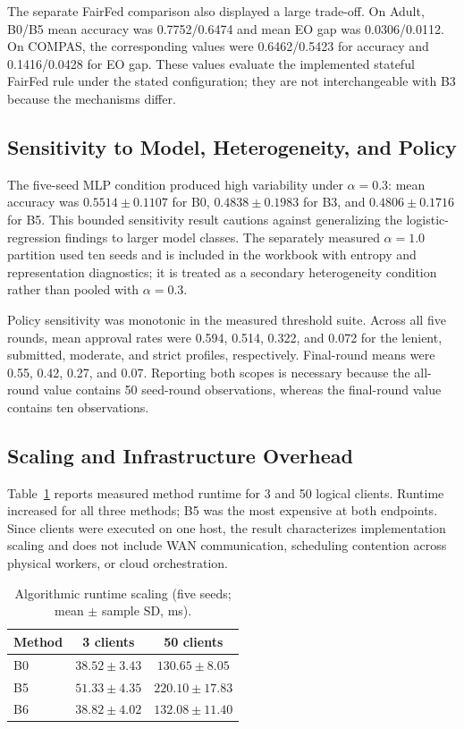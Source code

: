 \documentclass[futureinternet,article,submit,pdftex,moreauthors]{Definitions/mdpi}
\begin{document}
The separate FairFed comparison also displayed a large trade-off. On Adult, B0/B5 mean accuracy was 0.7752/0.6474 and mean EO gap was 0.0306/0.0112. On COMPAS, the corresponding values were 0.6462/0.5423 for accuracy and 0.1416/0.0428 for EO gap. These values evaluate the implemented stateful FairFed rule under the stated configuration; they are not interchangeable with B3 because the mechanisms differ.

\subsection{Sensitivity to Model, Heterogeneity, and Policy}

The five-seed MLP condition produced high variability under \(\alpha=0.3\): mean accuracy was \(0.5514\pm0.1107\) for B0, \(0.4838\pm0.1983\) for B3, and \(0.4806\pm0.1716\) for B5. This bounded sensitivity result cautions against generalizing the logistic-regression findings to larger model classes. The separately measured \(\alpha=1.0\) partition used ten seeds and is included in the workbook with entropy and representation diagnostics; it is treated as a secondary heterogeneity condition rather than pooled with \(\alpha=0.3\).

Policy sensitivity was monotonic in the measured threshold suite. Across all five rounds, mean approval rates were 0.594, 0.514, 0.322, and 0.072 for the lenient, submitted, moderate, and strict profiles, respectively. Final-round means were 0.55, 0.42, 0.27, and 0.07. Reporting both scopes is necessary because the all-round value contains 50 seed-round observations, whereas the final-round value contains ten observations.

\subsection{Scaling and Infrastructure Overhead}

Table~\ref{tab:results-scaling} reports measured method runtime for 3 and 50 logical clients. Runtime increased for all three methods; B5 was the most expensive at both endpoints. Since clients were executed on one host, the result characterizes implementation scaling and does not include WAN communication, scheduling contention across physical workers, or cloud orchestration.

\begin{table}[htpb]
	\caption{Algorithmic runtime scaling (five seeds; mean \(\pm\) sample SD, ms).}
	\label{tab:results-scaling}
	\centering
	\scriptsize
	\begin{tabular}{lcc}
		\toprule
		\textbf{Method} & \textbf{3 clients} & \textbf{50 clients} \\
		\midrule
		B0 & $38.52 \pm 3.43$ & $130.65 \pm 8.05$ \\
		B5 & $51.33 \pm 4.35$ & $220.10 \pm 17.83$ \\
		B6 & $38.82 \pm 4.02$ & $132.08 \pm 11.40$ \\
		\bottomrule
	\end{tabular}
\end{table}
\end{document}
